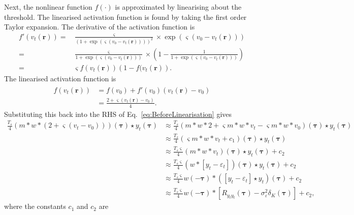 \documentclass[]{article}
\begin{document}
Next, the nonlinear function $f(\cdot)$ is approximated by linearising about the threshold. The linearised activation function is found by taking the first order Taylor expansion. The derivative of the activation function is
\begin{align}
 f'(v_t\left(\mathbf{r}\right))=& \frac{\varsigma}{\left(1 + \exp \left( \varsigma \left( v_0 - v_t\left(\mathbf{r}\right) \right) \right)\right)^2} \times \exp \left( \varsigma \left( v_0 - v_t\left(\mathbf{r}\right) \right) \right) \nonumber \\
=&\frac{\varsigma}{1 + \exp \left( \varsigma \left( v_0 - v_t\left(\mathbf{r}\right) \right) \right)} \times \left(1-\frac{1}{1 + \exp \left( \varsigma \left( v_0 - v_t\left(\mathbf{r}\right) \right) \right)}\right) \nonumber \\
=& \varsigma f(v_t\left(\mathbf{r}\right))\left( 1-f( v_t\left(\mathbf{r}\right)\right).
\end{align}
The linearised activation function is 
\begin{align}
	\hat{f}(v_t\left(\mathbf{r}\right)) &= f(v_0) + f'(v_0)(v_t\left(\mathbf{r}\right) - v_0) \\
	&= \frac{2 + \varsigma(v_t\left(\mathbf{r}\right) - v_0)}{4}. 
\end{align}
Substituting this back into the RHS of Eq.~\ref{eq:BeforeLinearisation} gives
\begin{align}
\frac{T_s}{4}(m\ast w* (2 + \varsigma(v_t - v_0)))(\boldsymbol\tau) \star y_t(\boldsymbol\tau) &\approx \frac{T_s}{4}(m\ast w\ast 2 + \varsigma m\ast w\ast v_t - \varsigma m\ast w\ast v_0 ) (\boldsymbol\tau) \star y_t(\boldsymbol\tau) \\
&\approx \frac{T_s}{4}(\varsigma m\ast w\ast v_t + c_1 ) (\boldsymbol\tau) \star y_t(\boldsymbol\tau) \\
&\approx \frac{T_s\varsigma}{4}( m \ast w\ast v_t ) (\boldsymbol\tau) \star y_t(\boldsymbol\tau) + c_2 \\
&\approx \frac{T_s\varsigma}{4}( w \ast \left[y_t-\varepsilon_t \right] ) (\boldsymbol\tau) \star y_t(\boldsymbol\tau) + c_2 \\
&\approx \frac{T_s\varsigma}{4} w(-\boldsymbol\tau) \ast (\left[y_t-\varepsilon_t \right]\star y_t ) (\boldsymbol\tau) + c_2 \\ 
&\approx \frac{T_s\varsigma}{4} w(-\boldsymbol\tau) \ast \left[R_{y_ty_t}(\boldsymbol\tau) - \sigma_{\varepsilon}^2 \delta_K(\boldsymbol\tau) \right] + c_2,
\end{align}
where the constants $c_1$ and $c_2$ are 
\end{document}
